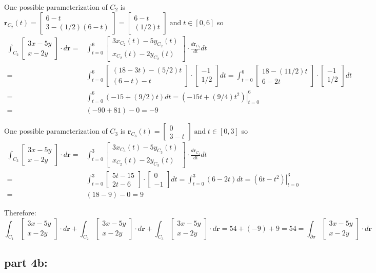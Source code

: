 \documentclass{article}
\newcommand{\colxyvec}[2]{\begin{bmatrix} #1 \\ #2 \end{bmatrix}}
\newcommand{\at}[1]{\left. #1 \right|}
\newcommand{\dr}[1]{\textcolor{dark_red}{#1}}
\begin{document}
\dr{One possible parameterization of \(C_2\) is \(\mathbf{r}_{C_2}(t) = \colxyvec{6-t}{3 - (1/2)(6 - t)} = \colxyvec{6-t}{(1/2)t} \;\text{and}\; t \in [0,6]\) so
\begin{align*}
\int_{C_2} \colxyvec{3x-5y}{x-2y} \cdot d\mathbf{r} = & \int_{t=0}^6 \colxyvec{3x_{C_2}(t) - 5y_{C_2}(t)}{x_{C_2}(t) - 2y_{C_2}(t)} \cdot \frac{d\mathbf{r}_{C_2}}{dt}dt \\
= & \int_{t=0}^6 \colxyvec{(18 - 3t) - (5/2)t}{(6 - t) - t} \cdot \colxyvec{-1}{1/2}dt 
= \int_{t=0}^6 \colxyvec{18 - (11/2)t}{6 - 2t} \cdot \colxyvec{-1}{1/2}dt \\
= & \int_{t=0}^6 (-15 + (9/2)t)dt 
= \at{(-15t + (9/4)t^2)}_{t=0}^6 \\
= & (-90 + 81) - 0 
= -9 
\end{align*}}

\dr{One possible parameterization of \(C_3\) is \(\mathbf{r}_{C_3}(t) = \colxyvec{0}{3 - t} \;\text{and}\; t \in [0,3]\) so
\begin{align*}
\int_{C_3} \colxyvec{3x-5y}{x-2y} \cdot d\mathbf{r} = & \int_{t=0}^3 \colxyvec{3x_{C_3}(t) - 5y_{C_3}(t)}{x_{C_2}(t) - 2y_{C_3}(t)} \cdot \frac{d\mathbf{r}_{C_3}}{dt}dt \\
= & \int_{t=0}^3 \colxyvec{5t - 15}{2t - 6} \cdot \colxyvec{0}{-1}dt 
= \int_{t=0}^3 (6 - 2t)dt 
= \at{(6t - t^2)}_{t=0}^3 \\
= & (18 - 9) - 0 
= 9 
\end{align*}}

\dr{Therefore: \[\int_{C_1} \colxyvec{3x-5y}{x-2y} \cdot d\mathbf{r} + \int_{C_2} \colxyvec{3x-5y}{x-2y} \cdot d\mathbf{r} + \int_{C_3} \colxyvec{3x-5y}{x-2y} \cdot d\mathbf{r} = 54 + (-9) + 9 = 54 = \int_{\partial\sigma} \colxyvec{3x-5y}{x-2y} \cdot d\mathbf{r}\]}



\subsection*{part 4b:}
\end{document}
